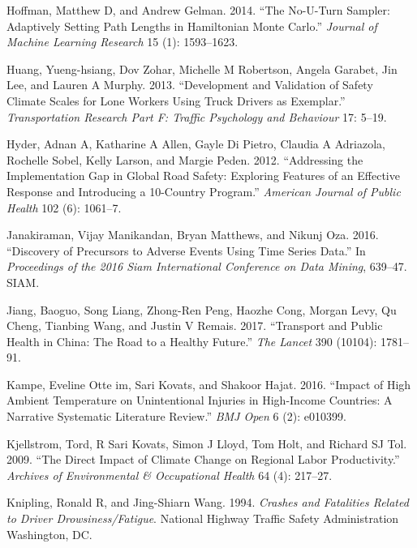 \documentclass[12pt]{book}
\numberwithin{equation}{chapter}
\begin{document}
\leavevmode\hypertarget{ref-hoffman2014no}{}%
Hoffman, Matthew D, and Andrew Gelman. 2014. ``The No-U-Turn Sampler: Adaptively Setting Path Lengths in Hamiltonian Monte Carlo.'' \emph{Journal of Machine Learning Research} 15 (1): 1593--1623.

\leavevmode\hypertarget{ref-huang2013development}{}%
Huang, Yueng-hsiang, Dov Zohar, Michelle M Robertson, Angela Garabet, Jin Lee, and Lauren A Murphy. 2013. ``Development and Validation of Safety Climate Scales for Lone Workers Using Truck Drivers as Exemplar.'' \emph{Transportation Research Part F: Traffic Psychology and Behaviour} 17: 5--19.

\leavevmode\hypertarget{ref-hyder2012addressing}{}%
Hyder, Adnan A, Katharine A Allen, Gayle Di Pietro, Claudia A Adriazola, Rochelle Sobel, Kelly Larson, and Margie Peden. 2012. ``Addressing the Implementation Gap in Global Road Safety: Exploring Features of an Effective Response and Introducing a 10-Country Program.'' \emph{American Journal of Public Health} 102 (6): 1061--7.

\leavevmode\hypertarget{ref-janakiraman2016discovery}{}%
Janakiraman, Vijay Manikandan, Bryan Matthews, and Nikunj Oza. 2016. ``Discovery of Precursors to Adverse Events Using Time Series Data.'' In \emph{Proceedings of the 2016 Siam International Conference on Data Mining}, 639--47. SIAM.

\leavevmode\hypertarget{ref-jiang2017transport}{}%
Jiang, Baoguo, Song Liang, Zhong-Ren Peng, Haozhe Cong, Morgan Levy, Qu Cheng, Tianbing Wang, and Justin V Remais. 2017. ``Transport and Public Health in China: The Road to a Healthy Future.'' \emph{The Lancet} 390 (10104): 1781--91.

\leavevmode\hypertarget{ref-im2016impact}{}%
Kampe, Eveline Otte im, Sari Kovats, and Shakoor Hajat. 2016. ``Impact of High Ambient Temperature on Unintentional Injuries in High-Income Countries: A Narrative Systematic Literature Review.'' \emph{BMJ Open} 6 (2): e010399.

\leavevmode\hypertarget{ref-kjellstrom2009direct}{}%
Kjellstrom, Tord, R Sari Kovats, Simon J Lloyd, Tom Holt, and Richard SJ Tol. 2009. ``The Direct Impact of Climate Change on Regional Labor Productivity.'' \emph{Archives of Environmental \& Occupational Health} 64 (4): 217--27.

\leavevmode\hypertarget{ref-knipling1994crashes}{}%
Knipling, Ronald R, and Jing-Shiarn Wang. 1994. \emph{Crashes and Fatalities Related to Driver Drowsiness/Fatigue}. National Highway Traffic Safety Administration Washington, DC.
\end{document}
